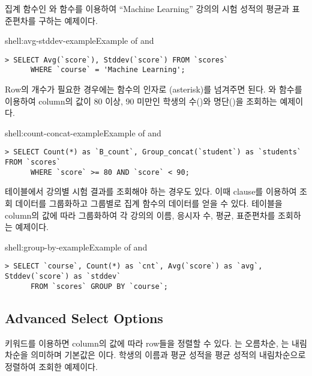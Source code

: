 \은 집계 함수인 와  함수를 이용하여 ``Machine Learning'' 강의의 시험 성적의 평균과 표준편차를 구하는 예제이다.

\begin{shellenv}{shell:avg-stddev-example}{Example of  and }\begin{verbatim}
> SELECT Avg(`score`), Stddev(`score`) FROM `scores`
      WHERE `course` = 'Machine Learning';
\end{verbatim}
\end{shellenv}

Row의 개수가 필요한 경우에는  함수의 인자로 \cd{*}(asterisk)를 넘겨주면 된다. \은 와  함수를 이용하여  column의 값이 80 이상, 90 미만인 학생의 수()와 명단()을 조회하는 예제이다.

\begin{shellenv}{shell:count-concat-example}{Example of  and }
\begin{verbatim}
> SELECT Count(*) as `B_count`, Group_concat(`student`) as `students` FROM `scores`
      WHERE `score` >= 80 AND `score` < 90;
\end{verbatim}
\end{shellenv}

 테이블에서 강의별 시험 결과를 조회해야 하는 경우도 있다. 이때  clause를 이용하여 조회 데이터를 그룹화하고 그룹별로 집계 함수의 데이터를 얻을 수 있다. \은  테이블을  column의 값에 따라 그룹화하여 각 강의의 이름, 응시자 수, 평균, 표준편차를 조회하는 예제이다.

\begin{shellenv}{shell:group-by-example}{Example of  and }
\begin{verbatim}
> SELECT `course`, Count(*) as `cnt`, Avg(`score`) as `avg`, Stddev(`score`) as `stddev`
      FROM `scores` GROUP BY `course`;
\end{verbatim}
\end{shellenv}

\subsection*{Advanced Select Options}

 키워드를 이용하면 column의 값에 따라 row들을 정렬할 수 있다. 는 오름차순, 는 내림차순을 의미하며 기본값은 이다. \은 학생의 이름과 평균 성적을 평균 성적의 내림차순으로 정렬하여 조회한 예제이다.

